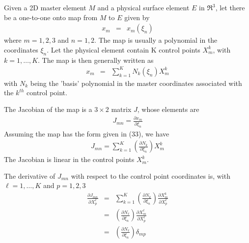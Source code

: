  \newline
Given a 2D master element $M$ and a physical surface element 
$E$ in $\Re^3$, let there be a one-to-one onto map from $M$ to $E$ given by 
\begin{eqnarray}
x_m & = & x_m ( \xi_n )
\end{eqnarray}
where $m = 1, 2, 3$ and $n = 1, 2$.  The map is usually a polynomial
in the coordinates $\xi_n$.  Let the physical element contain K control 
points $X_m^k$, with $k=1,\ldots,K$. The map is then generally written as 
\begin{eqnarray}
x_m & = & \sum_{k=1}^K N_k (\xi_n) X_m^k
\end{eqnarray}
with $N_k$ being the 'basis' polynomial in the master coordinates associated
with the $k^{th}$ control point. \newline

 \newline
The Jacobian of the map is a $3 \times 2$ matrix
$J$, whose elements are
\begin{eqnarray}
J_{mn} = \frac{\partial x_m}{\partial \xi_n} 
\end{eqnarray}
Assuming the map has the form given in (33), we have
\begin{eqnarray}
J_{mn} = \sum_{k=1}^K \left( \frac{\partial N_k}{\partial \xi_n} \right) X_m^k 
\end{eqnarray}
The Jacobian is linear in the control points $X_m^k$. \newline

\noindent The derivative of $J_{mn}$ with respect to the control point 
coordinates is, with $\ell=1,\ldots,K$ and $p=1,2,3$
\begin{eqnarray}
\frac{\partial J_{mn}}{\partial X_p^\ell} & = &  \sum_{k=1}^K \left( \frac{\partial N_k}{\partial \xi_n} \right) \frac{\partial X_m^k}{\partial X_p^\ell} \\
  & = &  \left( \frac{\partial N_\ell}{\partial \xi_n} \right) \frac{\partial X_m^\ell}{\partial X_p^\ell} \\
  & = &  \left( \frac{\partial N_\ell}{\partial \xi_n} \right) \delta_{m p}
\end{eqnarray}

